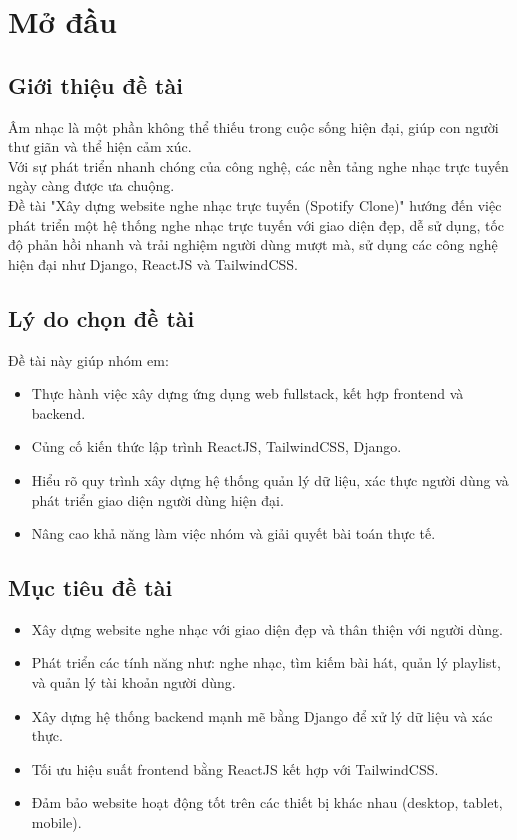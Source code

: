 \documentclass[a4paper]{article}
\begin{document}
\newpage
\tableofcontents
\newpage



\section{Mở đầu}
\subsection{Giới thiệu đề tài}

Âm nhạc là một phần không thể thiếu trong cuộc sống hiện đại, giúp con người thư giãn và thể hiện cảm xúc.\\
Với sự phát triển nhanh chóng của công nghệ, các nền tảng nghe nhạc trực tuyến ngày càng được ưa chuộng.\\
Đề tài "Xây dựng website nghe nhạc trực tuyến (Spotify Clone)" hướng đến việc phát triển một hệ thống nghe nhạc trực tuyến với giao diện đẹp, dễ sử dụng, tốc độ phản hồi nhanh và trải nghiệm người dùng mượt mà, sử dụng các công nghệ hiện đại như Django, ReactJS và TailwindCSS.

\subsection{Lý do chọn đề tài}

Đề tài này giúp nhóm em:
\begin{itemize}
    \item Thực hành việc xây dựng ứng dụng web fullstack, kết hợp frontend và backend.
    \item Củng cố kiến thức lập trình ReactJS, TailwindCSS, Django.
    \item Hiểu rõ quy trình xây dựng hệ thống quản lý dữ liệu, xác thực người dùng và phát triển giao diện người dùng hiện đại.
    \item Nâng cao khả năng làm việc nhóm và giải quyết bài toán thực tế.
\end{itemize}

\subsection{Mục tiêu đề tài}
\begin{itemize}
    \item Xây dựng website nghe nhạc với giao diện đẹp và thân thiện với người dùng.
    \item Phát triển các tính năng như: nghe nhạc, tìm kiếm bài hát, quản lý playlist, và quản lý tài khoản người dùng.
    \item Xây dựng hệ thống backend mạnh mẽ bằng Django để xử lý dữ liệu và xác thực.
    \item Tối ưu hiệu suất frontend bằng ReactJS kết hợp với TailwindCSS.
    \item Đảm bảo website hoạt động tốt trên các thiết bị khác nhau (desktop, tablet, mobile).
\end{itemize}
\end{document}
